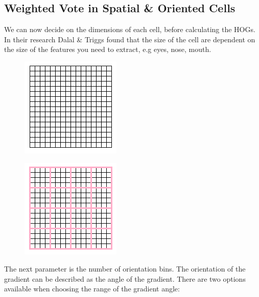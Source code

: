 \subsection{Weighted Vote in Spatial \& Oriented Cells}
We can now decide on the dimensions of each cell, before calculating the HOGs. In their research Dalal \& Triggs found that the size of the cell are dependent on the size of the features you need to extract, e.g eyes, nose, mouth. 
\begin{figure}[H]
\centering
\begin{minipage}{.5\textwidth}
  \centering
  \includegraphics[width=.5\linewidth]{pixels}
  \label{fig:test1}
\end{minipage}%
\begin{minipage}{.5\textwidth}
  \centering
  \includegraphics[width=.5\linewidth]{cells}
  \label{fig:test2}
\end{minipage}
\end{figure}
The next parameter is the number of orientation bins. The orientation of the gradient can be described as the angle of the gradient. There are two options available when choosing the range of the gradient angle:

